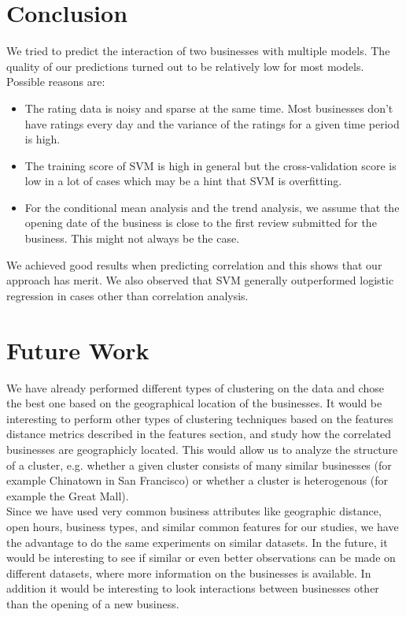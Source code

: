 \documentclass{vldb}
\begin{document}
\section{Conclusion}
We tried to predict the interaction of two businesses with multiple models.
The quality of our predictions turned out to be relatively low for most models.
Possible reasons are:
\begin{itemize}
\item The rating data is noisy and sparse at the same time. Most businesses don't have ratings every day and the variance of the ratings for a given time period is high.
\item The training score of SVM is high in general but the cross-validation score is low in a lot of cases which may be a hint that SVM is overfitting.
\item For the conditional mean analysis and the trend analysis, we assume that the opening date of the business is close to the first review submitted for the business. This might not always be the case.
\end{itemize}

We achieved good results when predicting correlation and this shows that our approach has merit.
We also observed that SVM generally outperformed logistic regression in cases other than correlation analysis.

\section{Future Work}
We have already performed different types of clustering on the data and chose the best one based on the geographical location of the businesses. It would be interesting to perform other types of clustering techniques based on the features distance metrics described in the features section, and study how the correlated businesses are geographicly located. This would allow us to analyze the structure of a cluster, e.g. whether a given cluster consists of many similar businesses (for example Chinatown in San Francisco) or whether a cluster is heterogenous (for example the Great Mall).\\
Since we have used very common business attributes like geographic distance, open hours, business types, and similar common features for our studies, we have the advantage to do the same experiments on similar datasets. In the future, it would be interesting to see if similar or even better observations can be made on different datasets, where more information on the businesses is available. In addition it would be interesting to look interactions between businesses other than the opening of a new business.


\end{document}
